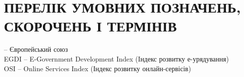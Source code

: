 \section*{ПЕРЕЛІК УМОВНИХ ПОЗНАЧЕНЬ, СКОРОЧЕНЬ І ТЕРМІНІВ}

 -- Європейський союз \\
EGDI -- E-Government Development Index (Iндекс розвитку е-урядування) \\
OSI -- Online Services Index (Індекс розвитку онлайн-сервісів)
